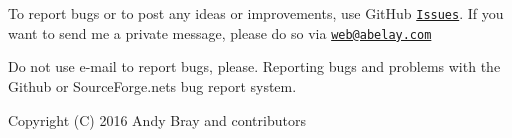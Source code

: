 To report bugs or to post any ideas or improvements, use Git\+Hub \href{https://github.com/abelayer/AbZip/issues}{\tt Issues}. If you want to send me a private message, please do so via \href{mailto:web@abelay.com}{\tt web@abelay.\+com}

Do not use e-\/mail to report bugs, please. Reporting bugs and problems with the Github or Source\+Forge.\+net\textquotesingle{}s bug report system.

Copyright (C) 2016 Andy Bray and contributors 